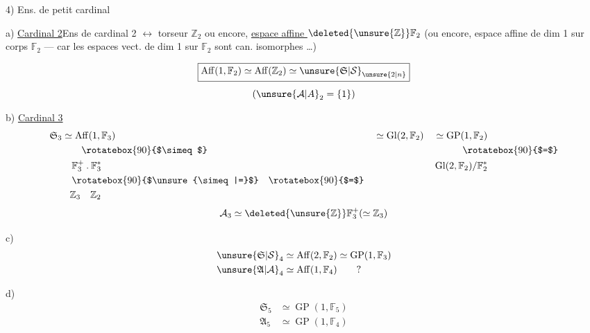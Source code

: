 
4) \quad Ens. de petit cardinal

a) \uline{Cardinal 2}\qquad Ens de cardinal 2 $\longleftrightarrow$ torseur  $\mathbb{Z}_2$ ou encore, \uline{espace affine } $\deleted{\unsure{\mathbb{Z}}}\mathbb{F}_2$ (ou encore,  espace affine de dim 1 sur corps $\mathbb{F}_2$ --- car les espaces vect. de dim 1 sur $\mathbb{F}_2$ sont can. isomorphes \ldots)

\[
\boxed{\operatorname{Aff}(1,\mathbb{F}_2)\simeq
 \operatorname{Aff}(\mathbb{Z}_2)\simeq\unsure{\mathfrak{S}|\mathcal{S}}_{\unsure{2|n}}}
\]
\[
(\unsure{\mathcal{A}|A}_2=\{1\})
\]

b) \uline{Cardinal 3}
\[
\begin{aligned}
\mathfrak{S}_3&\simeq\operatorname{Aff}(1,\mathbb{F}_3)&
 &\simeq\operatorname{Gl}(2,\mathbb{F}_2)&
 &\simeq\operatorname{GP}(1,\mathbb{F}_2)\\
&\hspace{2em}\rotatebox{90}{$\simeq$}&&&&\hspace{3em}\rotatebox{90}{$=$}\\
&\hspace{1em}\mathbb{F}_3^{+}\mathbin{.}\mathbb{F}_3^{*}
 &&&&\operatorname{Gl}(2,\mathbb{F}_2)/\mathbb{F}_2^{*}\\
&\hspace{1em}\rotatebox{90}{$\unsure{\simeq|=}$}
 \quad\rotatebox{90}{$=$}\\
&\hspace{.8em}\mathbb{Z}_3\quad\mathbb{Z}_2
\end{aligned}
\]
\[
\mathcal{A}_3\simeq\deleted{\unsure{\mathbb{Z}}}\mathbb{F}_3^{+}(\simeq\mathbb{Z}_3)
\]

c)
\[
\begin{aligned}
\unsure{\mathfrak{S}|\mathcal{S}}_4&\simeq\operatorname{Aff}(2,\mathbb{F}_2)\simeq\operatorname{GP}(1,\mathbb{F}_3)\\
\unsure{\mathfrak{A}|\mathcal{A}}_4&\simeq\operatorname{Aff}(1,\mathbb{F}_4)\qquad ?
\end{aligned}
\]

d)
\[
\begin{aligned}
\mathfrak{S}_5&\simeq\operatorname{GP}(1,\mathbb{F}_5)\\
\mathfrak{A}_5&\simeq\operatorname{GP}(1,\mathbb{F}_4)
\end{aligned}
\]

